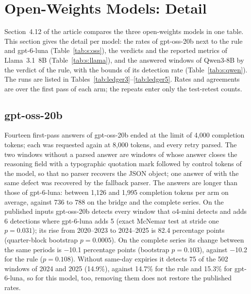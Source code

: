 \section{Open-Weights Models: Detail}
\label{sec:s:open}

Section~4.12 of the article compares the three open-weights models in one table. This section gives the detail per model: the rates of gpt-oss-20b next to the rule and gpt-6-luna (Table~\ref{tab:s:oss}), the verdicts and the reported metrics of Llama~3.1~8B (Table~\ref{tab:s:llama}), and the answered windows of Qwen3-8B by the verdict of the rule, with the bounds of its detection rate (Table~\ref{tab:s:qwen}). The runs are listed in Tables~\ref{tab:ledger3}--\ref{tab:ledger5}. Rates and agreements are over the first pass of each arm; the repeats enter only the test-retest counts.

\subsection{gpt-oss-20b}
\label{sec:s:open:oss}

Fourteen first-pass answers of gpt-oss-20b ended at the limit of 4{,}000 completion tokens; each was requested again at 8{,}000 tokens, and every retry parsed. The two windows without a parsed answer are windows of  whose answer closes the reasoning field with a typographic quotation mark followed by control tokens of the model, so that no parser recovers the JSON object; one answer of  with the same defect was recovered by the fallback parser. The answers are longer than those of gpt-6-luna: between 1{,}126 and 1{,}995 completion tokens per arm on average, against 736 to 788 on the bridge and the complete series. On the published inputs gpt-oss-20b detects every window that o4-mini detects and adds 6 detections where gpt-6-luna adds 5 (exact McNemar test at stride one $p=0.031$); its rise from 2020--2023 to 2024--2025 is 82.4 percentage points (quarter-block bootstrap $p=0.0005$). On the complete series its change between the same periods is $-$10.1 percentage points (bootstrap $p=0.103$), against $-$10.2 for the rule ($p=0.108$). Without same-day expiries it detects 75 of the 502 windows of 2024 and 2025 (14.9\%), against 14.7\% for the rule and 15.3\% for gpt-6-luna, so for this model, too, removing them does not restore the published rates.


